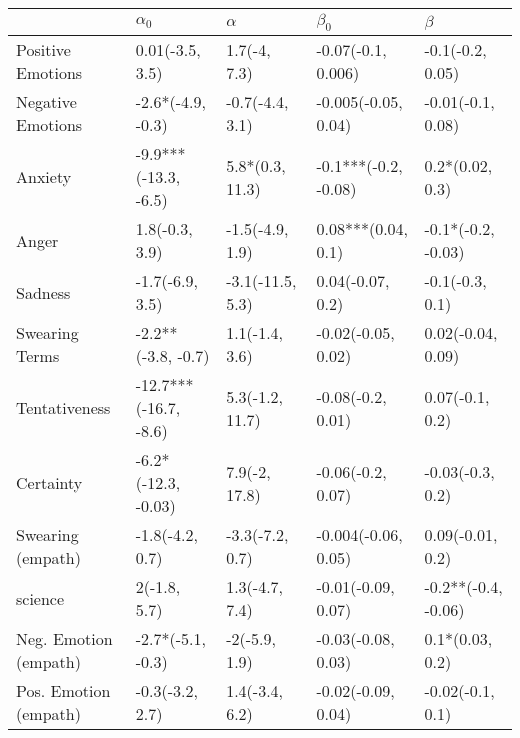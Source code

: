 \begin{tabular}{lllll}
\toprule
{} &             $\alpha_0$ &          $\alpha$ &             $\beta_0$ &              $\beta$ \\
\midrule
Positive Emotions     &        0.01(-3.5, 3.5) &      1.7(-4, 7.3) &    -0.07(-0.1, 0.006) &     -0.1(-0.2, 0.05) \\
Negative Emotions     &      -2.6*(-4.9, -0.3) &   -0.7(-4.4, 3.1) &   -0.005(-0.05, 0.04) &    -0.01(-0.1, 0.08) \\
Anxiety               &   -9.9***(-13.3, -6.5) &   5.8*(0.3, 11.3) &  -0.1***(-0.2, -0.08) &      0.2*(0.02, 0.3) \\
Anger                 &         1.8(-0.3, 3.9) &   -1.5(-4.9, 1.9) &    0.08***(0.04, 0.1) &   -0.1*(-0.2, -0.03) \\
Sadness               &        -1.7(-6.9, 3.5) &  -3.1(-11.5, 5.3) &      0.04(-0.07, 0.2) &      -0.1(-0.3, 0.1) \\
Swearing Terms        &     -2.2**(-3.8, -0.7) &    1.1(-1.4, 3.6) &    -0.02(-0.05, 0.02) &    0.02(-0.04, 0.09) \\
Tentativeness         &  -12.7***(-16.7, -8.6) &   5.3(-1.2, 11.7) &     -0.08(-0.2, 0.01) &      0.07(-0.1, 0.2) \\
Certainty             &    -6.2*(-12.3, -0.03) &     7.9(-2, 17.8) &     -0.06(-0.2, 0.07) &     -0.03(-0.3, 0.2) \\
Swearing (empath)     &        -1.8(-4.2, 0.7) &   -3.3(-7.2, 0.7) &   -0.004(-0.06, 0.05) &     0.09(-0.01, 0.2) \\
science               &           2(-1.8, 5.7) &    1.3(-4.7, 7.4) &    -0.01(-0.09, 0.07) &  -0.2**(-0.4, -0.06) \\
Neg. Emotion (empath) &      -2.7*(-5.1, -0.3) &     -2(-5.9, 1.9) &    -0.03(-0.08, 0.03) &      0.1*(0.03, 0.2) \\
Pos. Emotion (empath) &        -0.3(-3.2, 2.7) &    1.4(-3.4, 6.2) &    -0.02(-0.09, 0.04) &     -0.02(-0.1, 0.1) \\
\bottomrule
\end{tabular}
